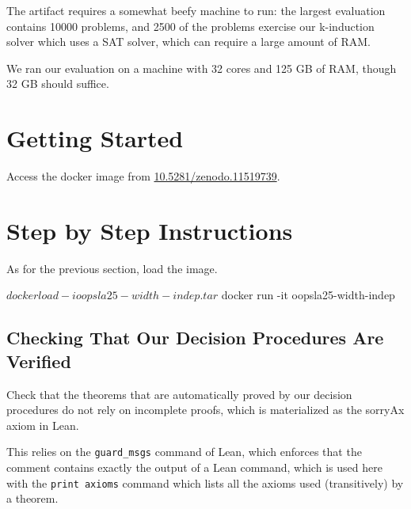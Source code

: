\documentclass[acmlarge, nonacm]{acmart}
\begin{document}
The artifact requires a somewhat beefy machine to run: the largest evaluation
contains 10000 problems, and 2500 of the problems exercise our k-induction
solver which uses a SAT solver, which can require a large amount of RAM.

We ran our evaluation on a machine with 32 cores and 125 GB of RAM, though 32 GB
should suffice.

\section{Getting Started}

Access the docker image from \url{10.5281/zenodo.11519739}.



\section{Step by Step Instructions}

As for the previous section, load the image.

\begin{script}
$ docker load -i oopsla25-width-indep.tar
$ docker run -it oopsla25-width-indep
\end{script}

\subsection{Checking That Our Decision Procedures Are Verified}

Check that the theorems that are automatically proved by our decision
procedures do not rely on incomplete proofs, which is materialized as the
sorryAx axiom in Lean.

This relies on the \texttt{guard\_msgs} command of Lean, which enforces that the
comment contains exactly the output of a Lean command, which is used here with
the \texttt{print axioms} command which lists all the axioms used (transitively)
by a theorem.
\end{document}
